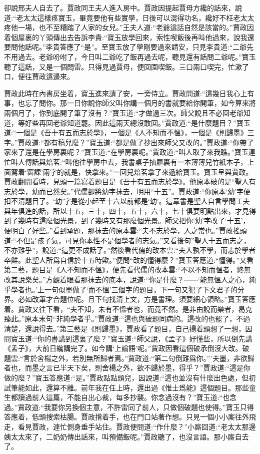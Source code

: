 \begin{parag}
    卻說邢夫人自去了。賈政同王夫人進入房中。賈政因提起賈母方纔的話來，說道:“老太太這樣疼寶玉，畢竟要他有些實學，日後可以混得功名，纔好不枉老太太疼他一場，也不至糟踏了人家的女兒。”王夫人道:“老爺這話自然是該當的。”賈政因着個屋裏的丫頭傳出去告訴李貴:“寶玉放學回來，索性喫飯後再叫他過來，說我還要問他話呢。”李貴答應了“是”。至寶玉放了學剛要過來請安，只見李貴道:“二爺先不用過去。老爺吩咐了，今日叫二爺吃了飯再過去呢，聽見還有話問二爺呢。”寶玉聽了這話，又是一個悶雷。只得見過賈母，便回園喫飯。三口兩口喫完，忙漱了口，便往賈政這邊來。
\end{parag}


\begin{parag}
    賈政此時在內書房坐着，寶玉進來請了安，一旁侍立。賈政問道:“這幾日我心上有事，也忘了問你。那一日你說你師父叫你講一個月的書就要給你開筆，如今算來將兩個月了，你到底開了筆了沒有？”寶玉道:“才做過三次。師父說且不必回老爺知道，等好些再回老爺知道罷。因此這兩天總沒敢回。”賈政道:“是什麼題目？”寶玉道:“一個是《吾十有五而志於學》，一個是《人不知而不慍》，一個是《則歸墨》三字。”賈政道:“都有稿兒麼？”寶玉道:“都是做了抄出來師父又改的。”賈政道:“你帶了家來了還是在學房裏呢？”寶玉道:“在學房裏呢。”賈政道:“叫人取了來我瞧。”寶玉連忙叫人傳話與焙茗:“叫他往學房中去，我書桌子抽屜裏有一本薄薄兒竹紙本子，上面寫着‘窗課’兩字的就是，快拿來。”一回兒焙茗拿了來遞給寶玉。寶玉呈與賈政。賈政翻開看時，見頭一篇寫着題目是《吾十有五而志於學》。他原本破的是“聖人有志於學，幼而已然矣。”代儒卻將幼字抹去，明用“十五”。賈政道:“你原本‘幼’字便扣不清題目了。‘幼’字是從小起至十六以前都是‘幼’。這章書是聖人自言學問工夫與年俱進的話，所以十五，三十，四十，五十，六十，七十俱要明點出來，才見得到了幾時有這麼個光景，到了幾時又有那麼個光景。師父把你‘幼’字改了‘十五’，便明白了好些。”看到承題，那抹去的原本雲:“夫不志於學，人之常也。”賈政搖頭道:“不但是孩子氣，可見你本性不是個學者的志氣。”又看後句”聖人十五而志之，不亦難乎”，說道:“這更不成話了。”然後看代儒的改本雲:“夫人孰不學，而志於學者卒鮮。此聖人所爲自信於十五時歟。”便問“改的懂得麼？”寶玉答應道:“懂得。”又看第二藝，題目是《人不知而不慍》，便先看代儒的改本雲:“不以不知而慍者，終無改其說樂矣。”方覷着眼看那抹去的底本，說道:“你是什麼？——‘能無慍人之心，純乎學者也。’上一句似單做了‘而不慍’三個字的題目，下一句又犯了下文君子的分界。必如改筆才合題位呢。且下句找清上文，方是書理。須要細心領略。”寶玉答應着。賈政又往下看，“夫不知，未有不慍者也，而竟不然。是非由說而樂者，曷克臻此。”原本末句“非純學者乎。”賈政道:“這也與破題同病的。這改的也罷了，不過清楚，還說得去。”第三藝是《則歸墨》，賈政看了題目，自己揚着頭想了一想，因問寶玉道:“你的書講到這裏了麼？”寶玉道:“師父說，《孟子》好懂些，所以倒先講《孟子》，大前日纔講完了。如今講‘上論語’呢。”賈政因看這個破承倒沒大改。破題雲:“言於舍楊之外，若別無所歸者焉。”賈政道:“第二句倒難爲你。”’夫墨，非欲歸者也，而墨之言已半天下矣，則舍楊之外，欲不歸於墨，得乎？”賈政道:“這是你做的麼？”寶玉答應道:“是。”賈政點點頭兒，因說道:“這也並沒有什麼出色處，但初試筆能如此，還算不離。前年我在任上時，還出過《惟士爲能》這個題目。那些童生都讀過前人這篇，不能自出心裁，每多抄襲。你念過沒有？”寶玉道:“也念過。”賈政道:“我要你另換個主意，不許雷同了前人，只做個破題也使得。”寶玉只得答應着，低頭搜索枯腸。賈政揹着手，也在門口站著作想。只見一個小小廝往外飛走，看見賈政，連忙側身垂手站住。賈政便問道:“作什麼？”小廝回道:“老太太那邊姨太太來了，二奶奶傳出話來，叫預備飯呢。”賈政聽了，也沒言語。那小廝自去了。

\end{parag}
